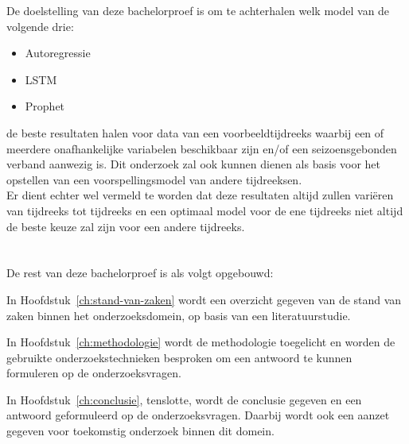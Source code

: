 De doelstelling van deze bachelorproef is om te achterhalen welk model van de volgende drie:
\begin{itemize}
    \item Autoregressie
    \item LSTM
    \item Prophet
\end{itemize}
 de beste resultaten halen voor data van een voorbeeldtijdreeks waarbij een of meerdere onafhankelijke variabelen beschikbaar zijn en/of een seizoensgebonden verband aanwezig is. Dit onderzoek zal ook kunnen dienen als basis voor het opstellen van een voorspellingsmodel van andere tijdreeksen. \\
 
 Er dient echter wel vermeld te worden dat deze resultaten altijd zullen vari\"{e}ren van tijdreeks tot tijdreeks en een optimaal model voor de ene tijdreeks niet altijd de beste keuze zal zijn voor een andere tijdreeks.

\section{}
\label{sec:opzet-bachelorproef}


De rest van deze bachelorproef is als volgt opgebouwd:

In Hoofdstuk~\ref{ch:stand-van-zaken} wordt een overzicht gegeven van de stand van zaken binnen het onderzoeksdomein, op basis van een literatuurstudie.

In Hoofdstuk~\ref{ch:methodologie} wordt de methodologie toegelicht en worden de gebruikte onderzoekstechnieken besproken om een antwoord te kunnen formuleren op de onderzoeksvragen.


In Hoofdstuk~\ref{ch:conclusie}, tenslotte, wordt de conclusie gegeven en een antwoord geformuleerd op de onderzoeksvragen. Daarbij wordt ook een aanzet gegeven voor toekomstig onderzoek binnen dit domein.